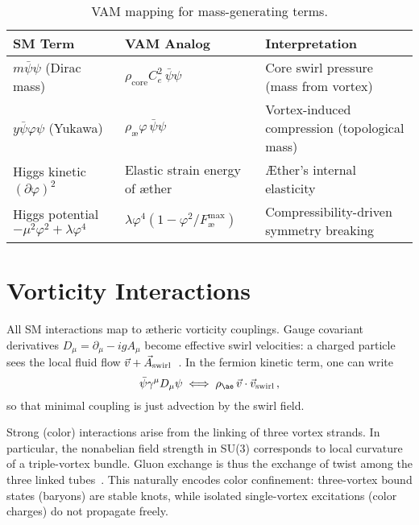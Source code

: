 \documentclass[a4paper,12pt]{article}
\begin{document}
\begin{table}[H]
    \centering
    \begin{tabular}{lll}
        \toprule
        \textbf{SM Term} & \textbf{VAM Analog} & \textbf{Interpretation} \\
        \midrule
        $m\bar{\psi}\psi$ (Dirac mass) & $\rho_{\text{core}} C_e^2\,\bar{\psi}\psi$ & Core swirl pressure (mass from vortex) \\
        $y\bar{\psi}\varphi\psi$ (Yukawa) & $\rho_{æ}\varphi\,\bar{\psi}\psi$ & Vortex-induced compression (topological mass) \\
        Higgs kinetic $(\partial\varphi)^2$ & Elastic strain energy of æther & Æther's internal elasticity \\
        Higgs potential $-\mu^2\varphi^2+\lambda\varphi^4$ & $\lambda\varphi^4(1-\varphi^2/F_{æ}^{\text{max}})$ & Compressibility-driven symmetry breaking \\
        \bottomrule
    \end{tabular}
    \caption{VAM mapping for mass-generating terms.}
    \label{tab:mass-map2}
\end{table}






\chapter*{Vorticity Interactions}

All SM interactions map to ætheric vorticity couplings. Gauge covariant derivatives $D_\mu = \partial_\mu - igA_\mu$ become effective swirl velocities: a charged particle sees the local fluid flow $\vec{v} + \vec{A}_{\rm swirl}$~\cite{vam-lagrangian}. In the fermion kinetic term, one can write
\begin{equation}
    \bar{\psi}\gamma^\mu D_\mu\psi \;\Longleftrightarrow\; \rho_{æ}\,\vec{v}\cdot\vec{v}_{\rm swirl}\,,
\end{equation}
so that minimal coupling is just advection by the swirl field.

Strong (color) interactions arise from the linking of three vortex strands. In particular, the nonabelian field strength in SU(3) corresponds to local curvature of a triple-vortex bundle. Gluon exchange is thus the exchange of twist among the three linked tubes~\cite{vam-lagrangian}. This naturally encodes color confinement: three-vortex bound states (baryons) are stable knots, while isolated single-vortex excitations (color charges) do not propagate freely.
\end{document}
